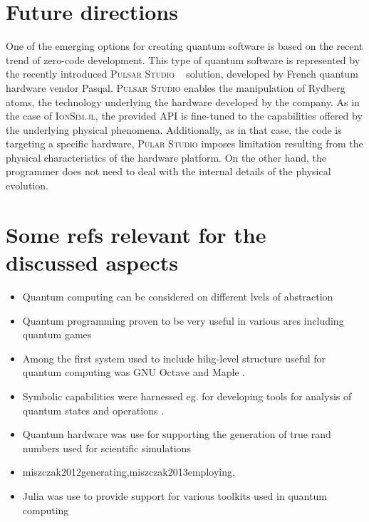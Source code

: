 \documentclass[10pt,a4paper]{article}
\newcommand{\pkg}[1]{\textsc{#1}}
\begin{document}
\section{Future directions}


One of the emerging options for creating quantum software is based on the recent trend of zero-code development. This type of quantum software is represented by the recently introduced \pkg{Pulsar Studio} ~\cite{pulsar-studio,pasqal-pulsar-s-1} solution, developed by French quantum hardware vendor Pasqal. \pkg{Pulsar Studio} enables the manipulation of Rydberg atoms, the technology underlying the hardware developed by the company. As in the case of \pkg{IonSim.jl}, the provided API is fine-tuned to the capabilities offered by the underlying physical phenomena. Additionally, as in that case, the code is targeting a specific hardware, \pkg{Pular Studio} imposes limitation resulting from the physical characteristics of the hardware platform. On the other hand, the programmer does not need to deal with the internal details of the physical evolution.

\appendix

\section{Some refs relevant for the discussed aspects}

\begin{itemize}
	
	\item Quantum computing can be considered on different lvels of abstraction \cite{miszczak2011models, miszczak2012high}
	
	\item Quantum programming proven to be very useful in various ares including quantum games \cite{miszczak2005quantum}
	
	\item Among the first system used to include hihg-level structure useful for quantum computing was GNU Octave \cite{gawron2010extending} and Maple \cite{}.
	
	\item Symbolic capabilities were harnessed eg. for developing tools for analysis of quantum states and operations \cite{miszczak2011singular}.
	
	\item Quantum hardware was use for supporting the generation of true rand numbers used for scientific simulations \item{miszczak2012generating,miszczak2013employing}.
	
	\item Julia was use to provide support for various toolkits used in quantum computing \cite{glos2019qswalk}
	
\end{itemize}


\nocite{*}

	
\end{document}
